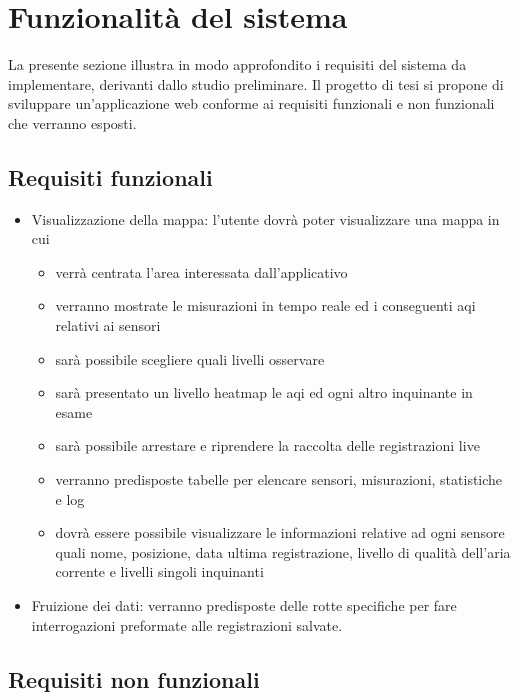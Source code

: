 \section{Funzionalità del sistema}

La presente sezione illustra in modo approfondito i requisiti del sistema da implementare, derivanti dallo studio
preliminare.
Il progetto di tesi si propone di sviluppare un'applicazione web conforme ai requisiti funzionali e
non funzionali che verranno esposti.

\subsection{Requisiti funzionali}
\label{subsec:requisiti-funzionali}

\begin{itemize}
  \item Visualizzazione della mappa: l'utente dovrà poter visualizzare una mappa in cui
        \begin{itemize}
          \item verrà centrata l'area interessata dall'applicativo
          \item verranno mostrate le misurazioni in tempo reale ed i conseguenti \acrfull{aqi} relativi ai sensori
          \item sarà possibile scegliere quali livelli osservare
          \item sarà presentato un livello heatmap le \acrfull{aqi} ed ogni altro inquinante in esame
          \item sarà possibile arrestare e riprendere la raccolta delle registrazioni live
          \item verranno predisposte tabelle per elencare sensori, misurazioni, statistiche e log
          \item dovrà essere possibile visualizzare le informazioni relative ad ogni sensore quali nome, posizione,
                data ultima registrazione, livello di qualità dell'aria corrente e livelli singoli inquinanti
        \end{itemize}
  \item Fruizione dei dati: verranno predisposte delle rotte specifiche per fare interrogazioni preformate alle
        registrazioni salvate.
\end{itemize}

\subsection{Requisiti non funzionali}
\label{subsec:requisiti-non-funzionali}

